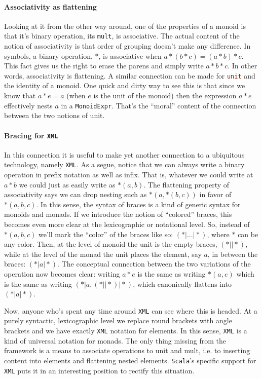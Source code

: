 \paragraph{Associativity as flattening}
Looking at it from the other way around, one of the properties of a
monoid is that it's binary operation, its
\lstinline[language=Scala]!mult!, is associative. The actual content of
the notion of associativity is that order of grouping doesn't make any
difference. In symbols, a binary operation, $*$, is associative when
$a*(b*c) = (a*b)*c$. This fact gives us the right to erase the parens
and simply write $a*b*c$. In other words, associativity is
flattening. A similar connection can be made for
\lstinline[language=Scala]!unit! and the identity of a monoid. One
quick and dirty way to see this is that since we know that $a*e=a$
(when $e$ is the unit of the monoid) then the expression $a*e$
effectively nests $a$ in a
\lstinline[language=Scala]!MonoidExpr!. That's the ``moral'' content
of the connection between the two notions of unit.

\paragraph{Bracing for \texttt{XML}}
In this connection it is useful to make yet another connection to a
ubiquitous technology, namely \texttt{XML}. As a segue, notice that we
can always write a binary operation in prefix notation as well as
infix. That is, whatever we could write at $a*b$ we could just as
easily write as $*(a,b)$. The flattening property of associativity
says we can drop nesting such as $*(a,*(b,c))$ in favor of
$*(a,b,c)$. In this sense, the syntax of braces is a kind of generic
syntax for monoids and monads. If we introduce the notion of
``colored'' braces, this becomes even more clear at the lexicographic
or notational level. So, instead of $*(a,b,c)$ we'll mark the
``color'' of the braces like so: $(*| ... |*)$, where $*$ can be any
color. Then, at the level of monoid the unit is the empty braces, $(*|
|*)$, while at the level of the monad the unit places the element, say
$a$, in between the braces: $(*| a |*)$. The conceptual connection
between the two variations of the operation now becomes clear: writing
$a*e$ is the same as writing $*(a,e)$ which is the same as writing
$(*| a , (*| |*) |*)$, which canonically flattens into $(*| a |*)$.

Now, anyone who's spent any time around \texttt{XML} can see where
this is headed. At a purely syntactic, lexicographic level we replace
round brackets with angle brackets and we have exactly \texttt{XML}
notation for elements. In this sense, \texttt{XML} is a kind of
universal notation for monads. The only thing missing from the
framework is a means to associate operations to unit and mult, i.e. to
inserting content into elements and flattening nested
elements. \texttt{Scala}'s specific support for \texttt{XML} puts it
in an interesting position to rectify this situation.

